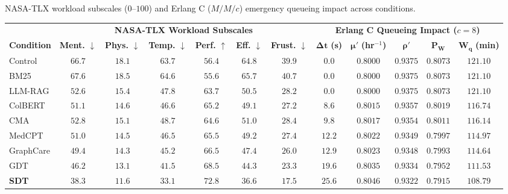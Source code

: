 \documentclass[ijds,dblanonrev]{informs4}
\begin{document}
\begin{table}[t]
\TABLE
{NASA-TLX workload subscales ($0$--$100$) and Erlang C ($M/M/c$) emergency queueing impact across conditions.\label{tab:tlx_queueing}}
{\small
\begin{tabular}{lcccccc|ccccc}
\toprule
& \multicolumn{6}{c|}{\textbf{NASA-TLX Workload Subscales}} & \multicolumn{5}{c}{\textbf{Erlang C Queueing Impact ($c=8$)}} \\
\cmidrule(lr){2-7} \cmidrule(lr){8-12}
\textbf{Condition} & \textbf{Ment.} $\downarrow$ & \textbf{Phys.} $\downarrow$ & \textbf{Temp.} $\downarrow$ & \textbf{Perf.} $\uparrow$ & \textbf{Eff.} $\downarrow$ & \textbf{Frust.} $\downarrow$ & $\mathbf{\Delta t}$ \textbf{(s)} & $\mathbf{\mu'}$ \textbf{(hr}$^{-1}$\textbf{)} & $\mathbf{\rho'}$ & $\mathbf{P_W}$ & $\mathbf{W_q}$ \textbf{(min)} \\
\midrule
Control   & $66.7$ & $18.1$ & $63.7$ & $56.4$ & $64.8$ & $39.9$ & $0.0$  & $0.8000$ & $0.9375$ & $0.8073$ & $121.10$ \\
BM25      & $67.6$ & $18.5$ & $64.6$ & $55.6$ & $65.7$ & $40.7$ & $0.0$  & $0.8000$ & $0.9375$ & $0.8073$ & $121.10$ \\
LLM-RAG   & $52.6$ & $15.4$ & $47.8$ & $63.7$ & $50.5$ & $28.2$ & $0.0$  & $0.8000$ & $0.9375$ & $0.8073$ & $121.10$ \\
ColBERT   & $51.1$ & $14.6$ & $46.6$ & $65.2$ & $49.1$ & $27.2$ & $8.6$  & $0.8015$ & $0.9357$ & $0.8019$ & $116.74$ \\
CMA       & $52.8$ & $15.1$ & $48.7$ & $64.6$ & $51.0$ & $28.4$ & $9.8$  & $0.8017$ & $0.9354$ & $0.8011$ & $116.14$ \\
MedCPT    & $51.0$ & $14.5$ & $46.5$ & $65.5$ & $49.2$ & $27.4$ & $12.2$ & $0.8022$ & $0.9349$ & $0.7997$ & $114.97$ \\
GraphCare & $49.4$ & $14.3$ & $45.2$ & $66.5$ & $47.4$ & $26.0$ & $12.9$ & $0.8023$ & $0.9348$ & $0.7993$ & $114.64$ \\
GDT       & $46.2$ & $13.1$ & $41.5$ & $68.5$ & $44.3$ & $23.3$ & $19.6$ & $0.8035$ & $0.9334$ & $0.7952$ & $111.53$ \\
\midrule
\textbf{SDT} & $\mathbf{38.3}$ & $\mathbf{11.6}$ & $\mathbf{33.1}$ & $\mathbf{72.8}$ & $\mathbf{36.6}$ & $\mathbf{17.5}$ & $\mathbf{25.6}$ & $\mathbf{0.8046}$ & $\mathbf{0.9322}$ & $\mathbf{0.7915}$ & $\mathbf{108.79}$ \\
\bottomrule
\end{tabular}
}
{}
\end{table}
\end{document}
